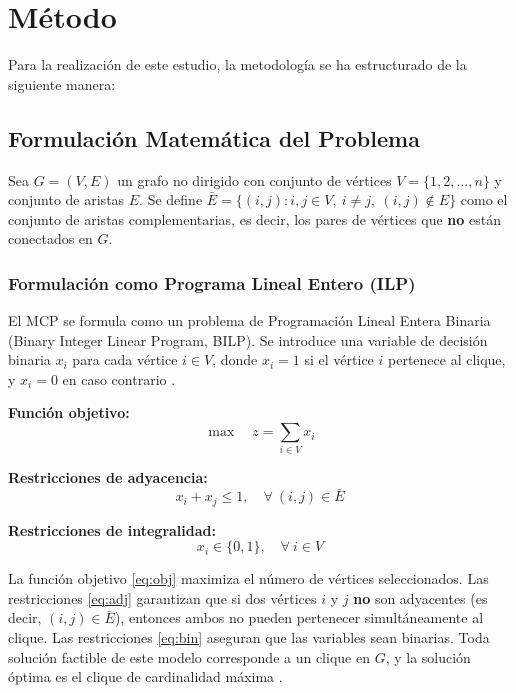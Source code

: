 \section{Método}\label{sec:met}

Para la realización de este estudio, la metodología se ha estructurado de la siguiente manera:

\subsection{Formulación Matemática del Problema}\label{subsec:formulacion}

Sea $G = (V, E)$ un grafo no dirigido con conjunto de vértices $V = \{1, 2, \ldots, n\}$ y conjunto de aristas $E$. Se define $\bar{E} = \{(i,j) : i,j \in V,\ i \neq j,\ (i,j) \notin E\}$ como el conjunto de aristas complementarias, es decir, los pares de vértices que \textbf{no} están conectados en $G$.

\subsubsection{Formulación como Programa Lineal Entero (ILP)}

El MCP se formula como un problema de Programación Lineal Entera Binaria (Binary Integer Linear Program, BILP). Se introduce una variable de decisión binaria $x_i$ para cada vértice $i \in V$, donde $x_i = 1$ si el vértice $i$ pertenece al clique, y $x_i = 0$ en caso contrario \cite{pardalos1992_maxclique, nemhauser1988}.

\vspace{0.3cm}
\noindent\textbf{Función objetivo:}
\begin{equation}\label{eq:obj}
    \max \quad z = \sum_{i \in V} x_i
\end{equation}

\noindent\textbf{Restricciones de adyacencia:}
\begin{equation}\label{eq:adj}
    x_i + x_j \leq 1, \quad \forall\ (i,j) \in \bar{E}
\end{equation}

\noindent\textbf{Restricciones de integralidad:}
\begin{equation}\label{eq:bin}
    x_i \in \{0, 1\}, \quad \forall\ i \in V
\end{equation}

La función objetivo \eqref{eq:obj} maximiza el número de vértices seleccionados. Las restricciones \eqref{eq:adj} garantizan que si dos vértices $i$ y $j$ \textbf{no} son adyacentes (es decir, $(i,j) \in \bar{E}$), entonces ambos no pueden pertenecer simultáneamente al clique. Las restricciones \eqref{eq:bin} aseguran que las variables sean binarias. Toda solución factible de este modelo corresponde a un clique en $G$, y la solución óptima es el clique de cardinalidad máxima \cite{pardalos1992_maxclique, bomze1999}.

